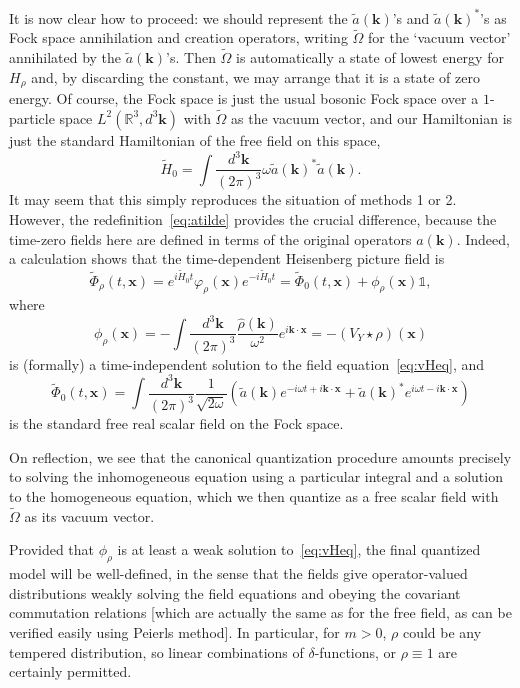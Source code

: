 \documentclass[12pt,a4paper]{article}
\newcommand{\1}{\mathds{1}}                         %
\newcommand{\RR}{\mathbb{R}}           %
\newcommand{\kb}{{\boldsymbol{k}}}
\newcommand{\xb}{{\boldsymbol{x}}}
\begin{document}
	It is now clear how to proceed: we should represent the $\tilde{a}(\kb)$'s and $\tilde{a}(\kb)^*$'s as Fock space annihilation and creation operators, 
	writing $\tilde{\Omega}$ for the `vacuum vector' annihilated by the $\tilde{a}(\kb)$'s. 
	Then $\tilde{\Omega}$ is automatically a state of lowest energy for $H_\rho$ and,
	by discarding the constant, we may arrange that it is a state of zero energy.
	Of course, the Fock space is just the usual bosonic Fock space over a $1$-particle space $L^2(\RR^3,d^3\kb)$ with $\tilde{\Omega}$ as the vacuum vector, 
	and our Hamiltonian is just the standard Hamiltonian of the free field on this space,
	\[
	\tilde{H}_0=\int\frac{d^3\kb}{(2\pi)^3} \omega \tilde{a}(\kb)^*\tilde{a}(\kb) .
	\] 
	It may seem that this simply reproduces the situation of methods 1 or 2. However, the redefinition~\eqref{eq:atilde} provides the crucial difference, because the time-zero fields here are defined in terms of the original operators $a(\kb)$. Indeed, a calculation shows that 
	the time-dependent Heisenberg picture field is
	\begin{equation}
	\tilde{\Phi}_\rho(t,\xb) = e^{i\tilde{H}_0 t}\varphi_\rho(\xb)e^{-i\tilde{H}_0 t} = \tilde{\Phi}_0(t,\xb) + \phi_\rho(\xb)\mathbb{1},
	\end{equation}
	where 
	\begin{equation}
	\phi_\rho(\xb) = -\int\frac{d^3\kb}{(2\pi)^3}\frac{\hat{\rho}(\kb)}{\omega^2} e^{i\kb\cdot\xb} = -(V_Y\star\rho)(\xb)
	\end{equation}
	is (formally) a time-independent solution to the field equation~\eqref{eq:vHeq}, and
	\begin{equation}
	\tilde{\Phi}_0(t,\xb) = \int\frac{d^3\kb}{(2\pi)^3}\frac{1}{\sqrt{2\omega}}
	(\tilde{a}(\kb)e^{-i\omega t + i\kb\cdot\xb} + \tilde{a}(\kb)^*e^{i\omega t - i\kb\cdot\xb})
	\end{equation} 
	is the standard free real scalar field on the Fock space.
	
	On reflection, we see that the canonical quantization procedure amounts precisely to solving the inhomogeneous equation using a particular integral and a solution to the homogeneous equation, which we then quantize as
	a free scalar field with $\tilde{\Omega}$ as its vacuum vector.	
		
	Provided that $\phi_\rho$ is at least a weak solution to~\eqref{eq:vHeq}, the final quantized model will be well-defined, in the sense that the fields give operator-valued distributions weakly solving the field equations and obeying the covariant commutation relations [which are actually the same as for the free field, as can be verified easily using Peierls method]. In particular, for $m>0$, $\rho$ could be any tempered distribution, so linear combinations of $\delta$-functions, or $\rho\equiv 1$ are certainly permitted.
			
\end{document}
